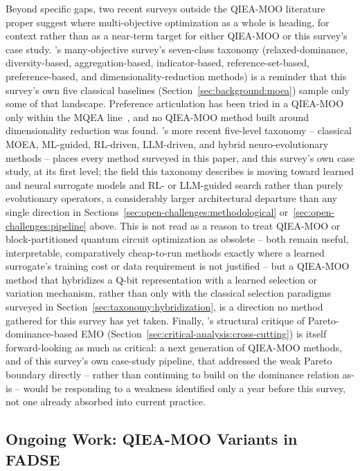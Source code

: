 Beyond specific gaps, two recent surveys outside the QIEA-MOO
literature proper suggest where multi-objective optimization as a
whole is heading, for context rather than as a near-term target for
either QIEA-MOO or this survey's case study.
\citet{li2015manyobjective}'s many-objective survey's seven-class
taxonomy (relaxed-dominance, diversity-based, aggregation-based,
indicator-based, reference-set-based, preference-based, and
dimensionality-reduction methods) is a reminder that this survey's own
five classical baselines (Section~\ref{sec:background:moea}) sample
only some of that landscape. Preference articulation has been tried
in a QIEA-MOO only within the MQEA line~\citep{kim2011mqeaps}, and no
QIEA-MOO method built around dimensionality reduction was found.
\citet{zheng2026paretoneural}'s more recent five-level taxonomy --
classical MOEA, ML-guided, RL-driven, LLM-driven, and hybrid
neuro-evolutionary methods -- places every method surveyed in this
paper, and this survey's own case study, at its first level; the field
this taxonomy describes is moving toward learned and neural surrogate
models and RL- or LLM-guided search rather than purely evolutionary
operators, a considerably larger architectural departure than any
single direction in Sections~\ref{sec:open-challenges:methodological}
or~\ref{sec:open-challenges:pipeline} above. This is not read as a
reason to treat QIEA-MOO or block-partitioned quantum circuit
optimization as obsolete -- both remain useful, interpretable,
comparatively cheap-to-run methods exactly where a learned surrogate's
training cost or data requirement is not justified -- but a
QIEA-MOO method that hybridizes a Q-bit representation with a learned
selection or variation mechanism, rather than only with the classical
selection paradigms surveyed in
Section~\ref{sec:taxonomy:hybridization}, is a direction no method
gathered for this survey has yet taken. Finally,
\citet{zheng2025weakparetoboundary}'s structural critique of
Pareto-dominance-based EMO (Section~\ref{sec:critical-analysis:cross-cutting})
is itself forward-looking as much as critical: a next generation of
QIEA-MOO methods, and of this survey's own case-study pipeline, that
addressed the weak Pareto boundary directly -- rather than continuing to
build on the dominance relation as-is -- would be responding to a
weakness identified only a year before this survey, not one already
absorbed into current practice.

\subsection{Ongoing Work: QIEA-MOO Variants in FADSE}
\label{sec:open-challenges:fadse}

